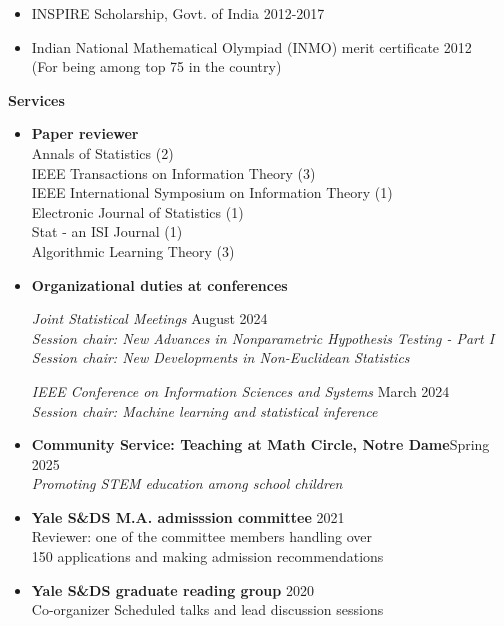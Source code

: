 \documentclass[letterpaper,12pt,oneside]{article}
\theoremstyle{definition}
\begin{document}
			\begin{itemize}
				\item [] INSPIRE Scholarship, Govt. of India \hfill 2012-2017
				\item [] Indian National Mathematical Olympiad (INMO) merit certificate \hfill 2012\\
				(For being among top 75 in the country)
			\end{itemize}
			
			
			\noindent \textbf{Services}
			\begin{itemize}
				\item[]
				{\bf Paper reviewer}\\
				Annals of Statistics (2)\\
				IEEE Transactions on Information Theory (3)\\
				IEEE International Symposium on Information Theory (1)\\
				Electronic Journal of Statistics (1)\\
				Stat - an ISI Journal (1)\\
				Algorithmic Learning Theory (3)
				
				\item[] 
				{\bf Organizational duties at conferences}
				
				{\it Joint Statistical Meetings} \hfill August 2024\\
				{\it Session chair: New Advances in Nonparametric Hypothesis Testing - Part I}\\
				{\it Session chair: New Developments in Non-Euclidean Statistics}
				
				{\it IEEE Conference on Information Sciences and Systems} \hfill March 2024\\
				{\it  Session chair: Machine learning and statistical inference}
				
				\item[] \textbf{Community Service: Teaching at Math Circle, Notre Dame}\hfill Spring 2025\\
				{\it Promoting STEM education among school children}
				
				
				\item[] {\bf Yale S\&DS M.A. admisssion committee} \hfill 2021\\
				Reviewer: one of the committee members
				handling over\\ 150 applications
				and making admission recommendations
				
				\item[] {\bf Yale S\&DS graduate reading group} \hfill 2020\\
				Co-organizer
				Scheduled talks and lead discussion sessions
				

\end{itemize}
\end{document}
